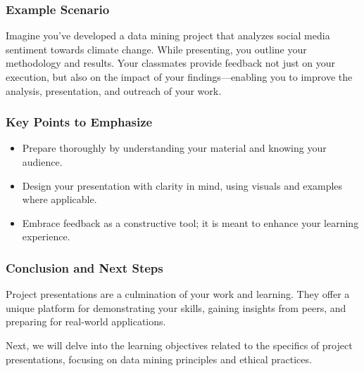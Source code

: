 \documentclass[aspectratio=169]{beamer}
\begin{document}
\begin{frame}[fragile]
    \frametitle{Example Scenario}
    Imagine you’ve developed a data mining project that analyzes social media sentiment towards climate change. While presenting, you outline your methodology and results. Your classmates provide feedback not just on your execution, but also on the impact of your findings—enabling you to improve the analysis, presentation, and outreach of your work.
\end{frame}

\begin{frame}[fragile]
    \frametitle{Key Points to Emphasize}
    \begin{itemize}
        \item Prepare thoroughly by understanding your material and knowing your audience.
        \item Design your presentation with clarity in mind, using visuals and examples where applicable.
        \item Embrace feedback as a constructive tool; it is meant to enhance your learning experience.
    \end{itemize}
\end{frame}

\begin{frame}[fragile]
    \frametitle{Conclusion and Next Steps}
    Project presentations are a culmination of your work and learning. They offer a unique platform for demonstrating your skills, gaining insights from peers, and preparing for real-world applications. 

    Next, we will delve into the learning objectives related to the specifics of project presentations, focusing on data mining principles and ethical practices.
\end{frame}
\end{document}
